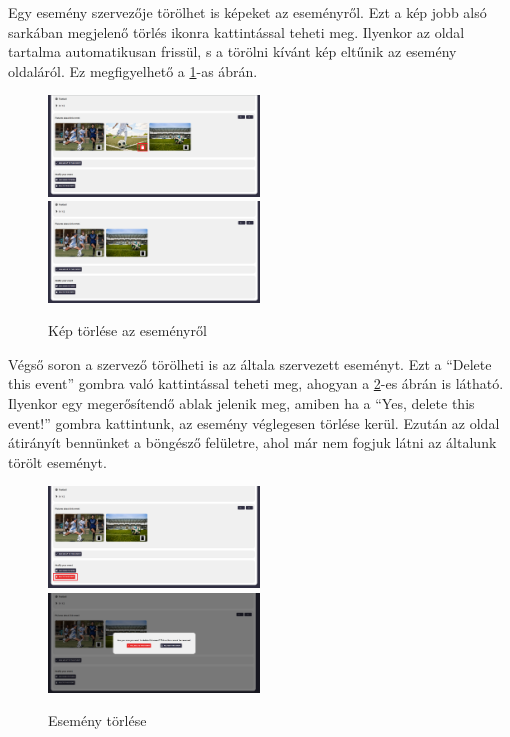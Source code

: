 Egy esemény szervezője törölhet is képeket az eseményről. Ezt a kép jobb alsó sarkában megjelenő törlés ikonra kattintással teheti meg. Ilyenkor az oldal 
tartalma automatikusan frissül, s a törölni kívánt kép eltűnik az esemény oldaláról. Ez megfigyelhető a \ref{fig:delete_image_event}-as ábrán.

\begin{figure}[h]
	\includegraphics[width=0.5\textwidth]{images/delete_image_event_1.png}
	\includegraphics[width=0.5\textwidth]{images/delete_image_event_2.png}
	\caption{Kép törlése az eseményről}
	\label{fig:delete_image_event}
\end{figure}

Végső soron a szervező törölheti is az általa szervezett eseményt. Ezt a ``Delete this event'' gombra való kattintással teheti meg, ahogyan a \ref{fig:delete_event_details}-es ábrán is látható.
Ilyenkor egy megerősítendő ablak jelenik meg, amiben ha a ``Yes, delete this event!'' gombra kattintunk, az esemény véglegesen törlése kerül.
Ezután az oldal átirányít bennünket a böngésző felületre, ahol már nem fogjuk látni az általunk törölt eseményt.

\newpage

\begin{figure}[ht]
	\includegraphics[width=0.5\textwidth]{images/delete_this_event_1.png}
	\includegraphics[width=0.5\textwidth]{images/delete_this_event_2.png}
	\caption{Esemény törlése}
	\label{fig:delete_event_details}
\end{figure}

